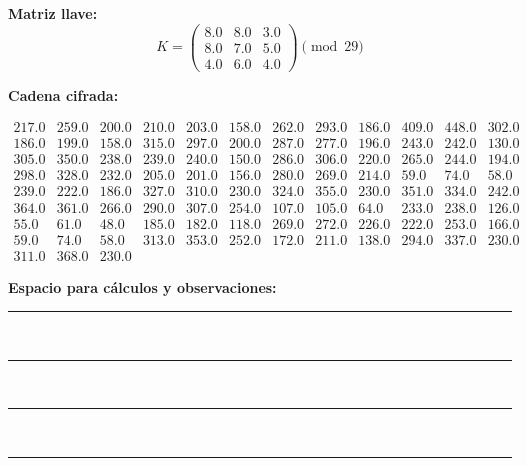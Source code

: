 \documentclass{article}%
\begin{document}
\textbf{Matriz llave:}
\[
K = \begin{pmatrix}
8.0 & 8.0 & 3.0 \\
8.0 & 7.0 & 5.0 \\
4.0 & 6.0 & 4.0
\end{pmatrix} \pmod{29}
\]

\textbf{Cadena cifrada:}
\begin{center}
$\begin{array}{lllllllllllllll}
217.0 & 259.0 & 200.0 & 210.0 & 203.0 & 158.0 & 262.0 & 293.0 & 186.0 & 409.0 & 448.0 & 302.0 \\
186.0 & 199.0 & 158.0 & 315.0 & 297.0 & 200.0 & 287.0 & 277.0 & 196.0 & 243.0 & 242.0 & 130.0 \\
305.0 & 350.0 & 238.0 & 239.0 & 240.0 & 150.0 & 286.0 & 306.0 & 220.0 & 265.0 & 244.0 & 194.0 \\
298.0 & 328.0 & 232.0 & 205.0 & 201.0 & 156.0 & 280.0 & 269.0 & 214.0 & 59.0 & 74.0 & 58.0 \\
239.0 & 222.0 & 186.0 & 327.0 & 310.0 & 230.0 & 324.0 & 355.0 & 230.0 & 351.0 & 334.0 & 242.0 \\
364.0 & 361.0 & 266.0 & 290.0 & 307.0 & 254.0 & 107.0 & 105.0 & 64.0 & 233.0 & 238.0 & 126.0 \\
55.0 & 61.0 & 48.0 & 185.0 & 182.0 & 118.0 & 269.0 & 272.0 & 226.0 & 222.0 & 253.0 & 166.0 \\
59.0 & 74.0 & 58.0 & 313.0 & 353.0 & 252.0 & 172.0 & 211.0 & 138.0 & 294.0 & 337.0 & 230.0 \\
311.0 & 368.0 & 230.0
\end{array}$
\end{center}

\bigskip
\textbf{Espacio para cálculos y observaciones:}\\[6pt]
\rule{\linewidth}{0.4pt}\\[10pt]
\rule{\linewidth}{0.4pt}\\[10pt]
\rule{\linewidth}{0.4pt}\\[10pt]
\rule{\linewidth}{0.4pt}\\[10pt]
%
\end{document}
